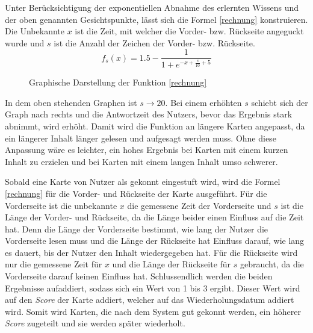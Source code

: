 Unter Berücksichtigung der exponentiellen Abnahme des erlernten Wissens und der oben genannten Gesichtspunkte, lässt sich die Formel \ref{rechnung} konstruieren. Die Unbekannte $x$ ist die Zeit, mit welcher die Vorder- bzw. Rückseite angeguckt wurde und $s$ ist die Anzahl der Zeichen der Vorder- bzw. Rückseite.
\begin{equation}
f_s(x) = 1.5 - \frac{1}{1+e^{-x + \frac{s}{10} + 5}}
\label{rechnung}
\end{equation}

\begin{figure}
    \centering
    \caption{Graphische Darstellung der Funktion \ref{rechnung}}
\end{figure}

In dem oben stehenden Graphen ist $s\rightarrow20$. Bei einem erhöhten $s$ schiebt sich der Graph nach rechts und die Antwortzeit des Nutzers, bevor das Ergebnis stark abnimmt, wird erhöht. Damit wird die Funktion an längere Karten angepasst, da ein längerer Inhalt länger gelesen und aufgesagt werden muss. Ohne diese Anpassung wäre es leichter, ein hohes Ergebnis bei Karten mit einem kurzen Inhalt zu erzielen und bei Karten mit einem langen Inhalt umso schwerer.

Sobald eine Karte von Nutzer als gekonnt eingestuft wird, wird die Formel \ref{rechnung} für die Vorder- und Rückseite der Karte ausgeführt. Für die Vorderseite ist die unbekannte $x$ die gemessene Zeit der Vorderseite und $s$ ist die Länge der Vorder- und Rückseite, da die Länge beider einen Einfluss auf die Zeit hat. Denn die Länge der Vorderseite bestimmt, wie lang der Nutzer die Vorderseite lesen muss und die Länge der Rückseite hat Einfluss darauf, wie lang es dauert, bis der Nutzer den Inhalt wiedergegeben hat. Für die Rückseite wird nur die gemessene Zeit für $x$ und die Länge der Rückseite für $s$ gebraucht, da die Vorderseite darauf keinen Einfluss hat. Schlussendlich werden die beiden Ergebnisse aufaddiert, sodass sich ein Wert von 1 bis 3 ergibt. Dieser Wert wird auf den \textit{Score} der Karte addiert, welcher auf das Wiederholungsdatum addiert wird. Somit wird Karten, die nach dem System gut gekonnt werden, ein höherer \textit{Score} zugeteilt und sie werden später wiederholt.

